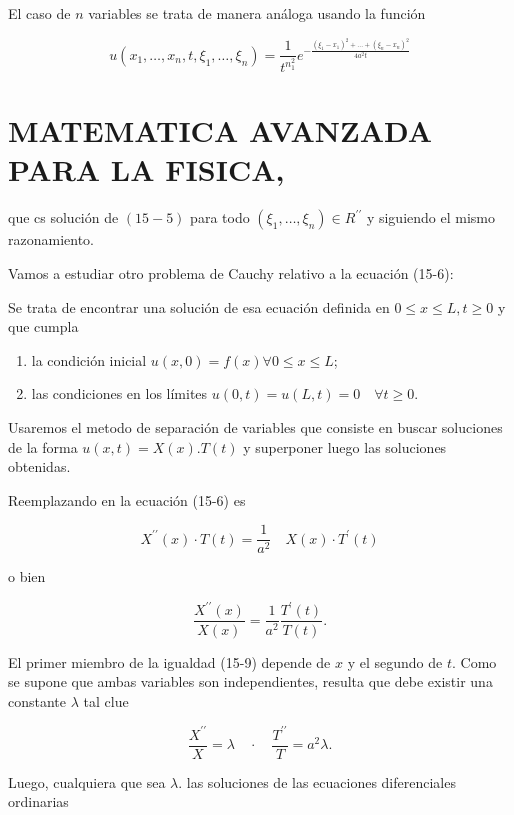 \documentclass[10pt]{article}
\theoremstyle{plain}
\theoremstyle{definition}
\theoremstyle{remark}
\begin{document}
El caso de $n$ variables se trata de manera análoga usando la función

$$
u\left(x_{1}, \ldots, x_{n}, t, \xi_{1}, \ldots, \xi_{n}\right)=\frac{1}{t^{n_{1}^{2}}} e^{-\frac{\left(\xi_{1}-x_{1}\right)^{2}+\ldots+\left(\xi_{n}-x_{n}\right)^{2}}{4 a^{2} t}}
$$

\section*{MATEMATICA AVANZADA PARA LA FISICA,}
que cs solución de $(15-5)$ para todo $\left(\xi_{1}, \ldots, \xi_{n}\right) \in R^{\prime \prime}$ y siguiendo el mismo razonamiento.

Vamos a estudiar otro problema de Cauchy relativo a la ecuación (15-6):

Se trata de encontrar una solución de esa ecuación definida en $0 \leqslant x \leqslant L, t \geqslant 0$ y que cumpla

\begin{enumerate}
  \item la condición inicial $u(x, 0)=f(x) \forall 0 \leqslant x \leqslant L$;
  \item las condiciones en los límites $u(0, t)=u(L, t)=0 \quad \forall t \geqslant 0$.
\end{enumerate}

Usaremos el metodo de separación de variables que consiste en buscar soluciones de la forma $u(x, t)=X(x) . T(t)$ y superponer luego las soluciones obtenidas.

Reemplazando en la ecuación (15-6) es

$$
X^{\prime \prime}(x) \cdot T(t)=\frac{1}{a^{2}} \quad X(x) \cdot T^{\prime}(t)
$$

o bien


\begin{equation*}
\frac{X^{\prime \prime}(x)}{X(x)}=\frac{1}{a^{2}} \frac{T^{\prime}(t)}{T(t)} . \tag{15.9}
\end{equation*}


El primer miembro de la igualdad (15-9) depende de $x$ y el segundo de $t$. Como se supone que ambas variables son independientes, resulta que debe existir una constante $\lambda$ tal clue

$$
\frac{X^{\prime \prime}}{X}=\lambda \quad \cdot \quad \frac{T^{\prime \prime}}{T}=a^{2} \lambda .
$$

Luego, cualquiera que sea $\lambda$. las soluciones de las ecuaciones diferenciales ordinarias
\end{document}
